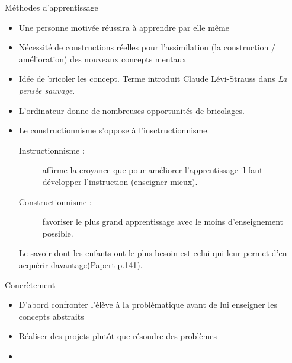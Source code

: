 \begin{frame}{Méthodes d'apprentissage}
\begin{itemize}
  \item Une personne motivée réussira à apprendre par elle même
  \item Nécessité de constructions réelles pour l'assimilation (la construction / amélioration) des nouveaux concepts mentaux
  \item Idée de bricoler les concept. Terme introduit Claude Lévi-Strauss dans \textit{La pensée sauvage}. %
  \item L'ordinateur donne de nombreuses opportunités de bricolages.
  \item Le constructionnisme s'oppose à l'insctructionnisme.
  \begin{description}
    \item[Instructionnisme : ]affirme la croyance que pour améliorer l'apprentissage il faut développer l'instruction (enseigner mieux).
    \item[Constructionnisme : ]favoriser le plus grand apprentissage avec le moins d'enseignement possible.
    \end{description}
    \og{}Le savoir dont les enfants ont le plus besoin est celui qui leur permet d'en acquérir davantage\fg (Papert p.141).
\end{itemize}
\end{frame}

\begin{frame}{Concrètement}
\begin{itemize}
  \item D'abord confronter l'élève à la problématique avant de lui enseigner les concepts abstraits
  \item Réaliser des projets plutôt que résoudre des problèmes
  \item 
\end{itemize}
\end{frame}

